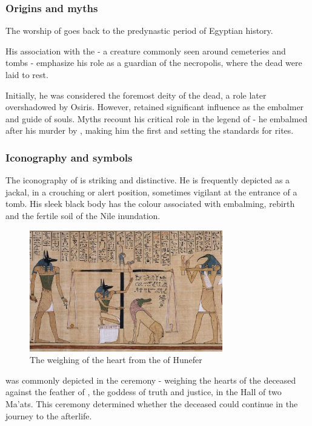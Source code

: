 \subsubsection*{Origins and myths}
The worship of  goes back to the predynastic period of Egyptian history.

His association with the  - a creature commonly seen around cemeteries and tombs - emphasize his role as a guardian of the necropolis, where the dead were laid to rest.

Initially, he was considered the foremost deity of the dead, a role later overshadowed by Osiris. However,  retained significant influence as the embalmer and guide of souls. Myths recount his critical role in the legend of  - he embalmed  after his murder by , making him the first  and setting the standards for  rites.

\subsubsection*{Iconography and symbols}
The iconography of  is striking and distinctive. He is frequently depicted as a jackal, in a crouching or alert position, sometimes vigilant at the entrance of a tomb. His sleek black body has the colour associated with embalming, rebirth and the fertile soil of the Nile inundation.

\begin{figure} [H]
	\centering
	\includegraphics[width=0.75\textwidth]{../photos/Anubis_Hunefer}
	\caption{The weighing of the heart from the  of Hunefer}
\end{figure}

 was commonly depicted in the  ceremony - weighing the hearts of the deceased against the feather of , the goddess of truth and justice, in the Hall of two Ma'ats. This ceremony determined whether the deceased could continue in the journey to the afterlife.

